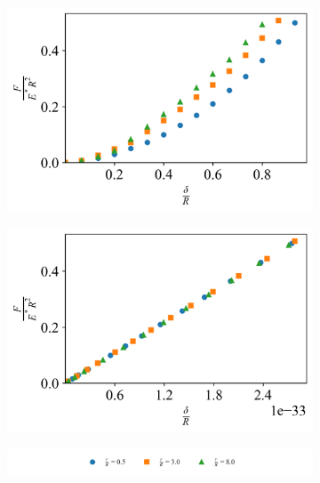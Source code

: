 \begin{figure}[H]
    \hfill

    \begin{subfigure}[t]{0.45\textwidth}
        \centering
        \caption{\label{fig: Sphere-Sphere-Force_Curve} }
        \includegraphics[width=1\linewidth]{Figures/Sphere-Sphere-Force_Curve-Indenter.png}
    \end{subfigure}
    \hfill
    \begin{subfigure}[t]{0.45\textwidth}
        \centering
        \caption{\label{fig: Sphere-Sphere-Force_Curve-Base} }
        \includegraphics[width=1\linewidth]{Figures/Sphere-Sphere-Force_Curve-Base.png}
    \end{subfigure}

    \hfill
    
    \begin{subfigure}[t]{1\textwidth}
        \includegraphics[width=1\linewidth]{Figures/Spheres-Force_Curve-Legend.png}
    \end{subfigure} 


\end{figure}
